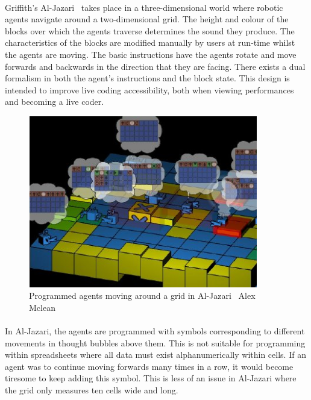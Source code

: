 \paragraph{} Griffith's Al-Jazari~\cite{mclean:visualisation} takes place in a three-dimensional world where robotic agents navigate around a two-dimensional grid. The height and colour of the blocks over which the agents traverse determines the sound they produce. The characteristics of the blocks are modified manually by users at run-time whilst the agents are moving. The basic instructions have the agents rotate and move forwards and backwards in the direction that they are facing. There exists a dual formalism in both the agent's instructions and the block state. This design is intended to improve live coding accessibility, both when viewing performances and becoming a live coder.

\begin{figure}[ht]
  \centerline{\includegraphics[width=100mm]{figs/alJazari.jpg}}
\caption{Programmed agents moving around a grid in Al-Jazari \textcopyright\ Alex Mclean}
\label{prep:alJazari}
\end{figure}

\vspace{-20pt}
\paragraph{} In Al-Jazari, the agents are programmed with symbols corresponding to different movements in thought bubbles above them. This is not suitable for programming within spreadsheets where all data must exist alphanumerically within cells. If an agent was to continue moving forwards many times in a row, it would become tiresome to keep adding this symbol. This is less of an issue in Al-Jazari where the grid only measures ten cells wide and long.

